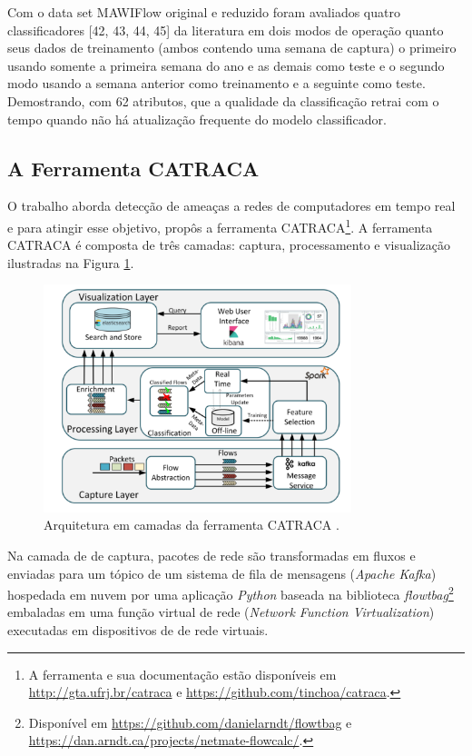 Com o data set MAWIFlow original e reduzido foram avaliados quatro classificadores [42, 43, 44, 45]
da literatura em dois modos de operação quanto seus dados de treinamento
(ambos contendo uma semana de captura) o primeiro usando somente a primeira semana do ano e as demais
como teste e o segundo modo usando a semana anterior como treinamento e a seguinte como teste.
Demostrando, com 62 atributos, que a qualidade da classificação retrai com o tempo quando não há
atualização frequente do modelo classificador.

\subsection{A Ferramenta CATRACA}

O trabalho  aborda detecção de ameaças a redes de
computadores em tempo real e para atingir esse objetivo, propôs a ferramenta
CATRACA\footnote{
    A ferramenta e sua documentação estão disponíveis em \url{http://gta.ufrj.br/catraca}
    e \url{https://github.com/tinchoa/catraca}.
}.
A ferramenta CATRACA é composta de três camadas: captura, processamento e visualização
ilustradas na Figura \ref{fig:catraca}.

\begin{figure}[ht]
\centering
\includegraphics[width=0.8\textwidth]{figuras/catraca-arch.png}
\caption{Arquitetura em camadas da ferramenta CATRACA \cite{Lopez2018}.}
\label{fig:catraca}
\end{figure}


Na camada de de captura, pacotes de rede são transformadas em fluxos e enviadas 
para um tópico de um sistema de fila de mensagens (\emph{Apache Kafka}) hospedada em nuvem
por uma aplicação \emph{Python} baseada na biblioteca \emph{flowtbag}\footnote{
    Disponível em \url{https://github.com/danielarndt/flowtbag} e \url{https://dan.arndt.ca/projects/netmate-flowcalc/}.
}
embaladas em uma função virtual de rede (\emph{Network Function Virtualization}) 
executadas em dispositivos de de rede virtuais.


